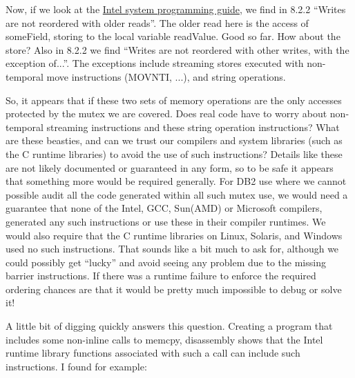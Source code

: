 {{Now, if we look at the \href{http://download.intel.com/design/intarch/manuals/24319101.pdf}{Intel system programming guide}, we find in 8.2.2 ``Writes are not reordered with older reads''.  The older read here is the access of someField, storing to the local variable readValue.  Good so far.  How about the store?  Also in 8.2.2 we find ``Writes are not reordered with other writes, with the exception of...''.  The exceptions include streaming stores executed with non-temporal move instructions (MOVNTI, ...), and string operations.

So, it appears that if these two sets of memory operations are the only accesses protected by the mutex we are covered.  Does real code have to worry about non- temporal streaming instructions and these string operation instructions?  What are these beasties, and can we trust our compilers and system libraries (such as the C runtime libraries) to avoid the use of such instructions?  Details like these are not likely documented or guaranteed in any form, so to be safe it appears that something more would be required generally.  For DB2 use where we cannot possible audit all the code generated within all such mutex use, we would need a guarantee that none of the Intel, GCC, Sun(AMD) or Microsoft compilers, generated any such instructions or use these in their compiler runtimes.  We would also require that the C runtime libraries on Linux, Solaris, and Windows used no such instructions.  That sounds like a bit much to ask for, although we could possibly get ``lucky'' and avoid seeing any problem due to the missing  barrier instructions.  If there was a runtime failure to enforce the required ordering chances are that it would be pretty much impossible to debug or solve it!

A little bit of digging quickly answers this question.  Creating a program that includes some non-inline calls to memcpy, disassembly shows that the Intel runtime library functions associated with such a call can include such instructions.  I found for example:
 
}}
